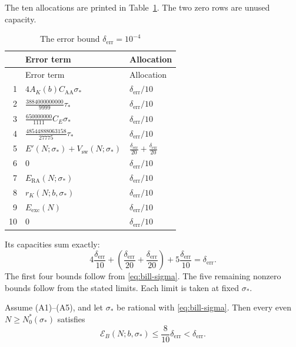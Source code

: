 The ten allocations are printed in Table~\ref{tab:bill}.
The two zero rows are unused capacity.
\begingroup
\small
\renewcommand{\arraystretch}{1.65}
\setlength{\extrarowheight}{2pt}
\begin{longtable}{@{}r p{.60\linewidth} p{.25\linewidth}@{}}
\caption{The error bound $\delta_{\mathrm{err}}=10^{-4}$}
\label{tab:bill}\\
\hline
 & Error term & Allocation\\
\hline
\endfirsthead
\hline
 & Error term & Allocation\\
\hline
\endhead
1 & $4A_K(b)C_{\mathrm{AA}}\sigma_*$ & $\delta_{\mathrm{err}}/10$\\
2 & $\tfrac{3884000000000}{9999}\tau_*$ & $\delta_{\mathrm{err}}/10$\\
3 & $\tfrac{650000000}{1111}C_E\sigma_*$ & $\delta_{\mathrm{err}}/10$\\
4 & $\tfrac{48544888063158}{27775}\tau_*$ & $\delta_{\mathrm{err}}/10$\\
5 & $E'(N;\sigma_*)+V_{\mathrm{sw}}(N;\sigma_*)$
    & $\tfrac{\delta_{\mathrm{err}}}{20}+\tfrac{\delta_{\mathrm{err}}}{20}$\\
6 & $0$ & $\delta_{\mathrm{err}}/10$\\
7 & $E_{\mathrm{RA}}(N;\sigma_*)$ & $\delta_{\mathrm{err}}/10$\\
8 & $r_K(N;b,\sigma_*)$ & $\delta_{\mathrm{err}}/10$\\
9 & $E_{\mathrm{exc}}(N)$ & $\delta_{\mathrm{err}}/10$\\
10 & $0$ & $\delta_{\mathrm{err}}/10$\\
\hline
\end{longtable}
\endgroup
Its capacities sum exactly:
\begin{equation}\label{eq:bill-sum}
 4\frac{\delta_{\mathrm{err}}}{10}
 +\left(\frac{\delta_{\mathrm{err}}}{20}
       +\frac{\delta_{\mathrm{err}}}{20}\right)
 +5\frac{\delta_{\mathrm{err}}}{10}
 =\delta_{\mathrm{err}}.
\end{equation}
The first four bounds follow from \eqref{eq:bill-sigma}.
The five remaining nonzero bounds follow from the stated limits.
Each limit is taken at fixed $\sigma_*$.

\begin{proposition}\label{prop:bill-budget}
Assume \textup{(A1)}--\textup{(A5)}, and let $\sigma_*$ be rational with
\eqref{eq:bill-sigma}. Then every even $N\ge N_0^*(\sigma_*)$ satisfies
\begin{equation}\label{eq:bill-budget}
 \mathcal E_B(N;b,\sigma_*)\le\frac8{10}\delta_{\mathrm{err}}
 <\delta_{\mathrm{err}}.
\end{equation}
\end{proposition}

